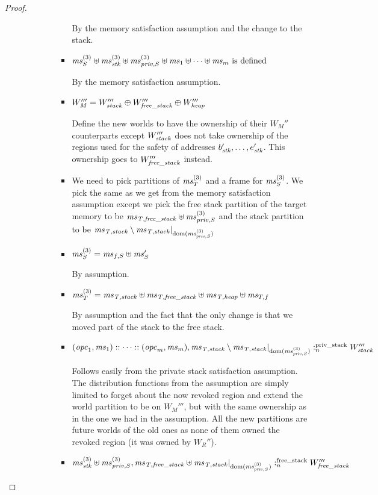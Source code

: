 \begin{proof}
\begin{description}
\begin{itemize}
\begin{itemize}
\begin{itemize}
          By the memory satisfaction assumption and the change to the stack.
        \item $\mathit{ms}^{(3)}_S \uplus \mathit{ms}^{(3)}_{\mathit{stk}} \uplus \mathit{ms}_{\mathit{priv},S}^{(3)} \uplus \mathit{ms}_1 \uplus \dots \uplus \mathit{ms}_m \text{ is defined}$

          By the memory satisfaction assumption.
        \item $W'''_M = W_{\mathit{stack}}''' \oplus W_{\mathit{free\_stack}}''' \oplus W_{\mathit{heap}}'''$

          Define the new worlds to have the ownership of their $W_M''$ counterparts except $W_{\mathit{stack}}'''$ does not take ownership of the regions used for the safety of addresses $b_{\mathit{stk}}',\dots,e_{\mathit{stk}}'$.
          This ownership goes to $W_{\mathit{free\_stack}}'''$ instead.
        \item We need to pick partitions of $\mathit{ms}^{(3)}_T$ and a frame for $\mathit{ms}^{(3)}_S$.
          We pick the same as we get from the memory satisfaction assumption except we pick the free stack partition of the target memory to be $\mathit{ms}_{\mathit{T,free\_stack}} \uplus \mathit{ms}_{\mathit{priv},S}^{(3)}$ and the stack partition to be $\mathit{ms}_{\mathit{T,stack}}\setminus \mathit{ms}_{\mathit{T,stack}} | _{\mathrm{dom}(\mathit{ms}_{\mathit{priv},S}^{(3)})}$
        \item $\mathit{ms}^{(3)}_S = \mathit{ms}_{f,S} \uplus \mathit{ms}_S'$

          By assumption.
        \item $\mathit{ms}^{(3)}_T = \mathit{ms}_{\mathit{T,stack}} \uplus \mathit{ms}_{\mathit{T,free\_stack}} \uplus \mathit{ms}_{\mathit{T,heap}} \uplus \mathit{ms}_{T,f}$

          By assumption and the fact that the only change is that we moved part of the stack to the free stack.
        \item $(\mathit{opc}_1,\mathit{ms}_1):: \dots :: (\mathit{opc}_m,\mathit{ms}_m),\mathit{ms}_{\mathit{T,stack}}\setminus \mathit{ms}_{\mathit{T,stack}} | _{\mathrm{dom}(\mathit{ms}_{\mathit{priv},S}^{(3)})} :_{n}^{\text{priv\_stack}}W_{\mathit{stack}}'''$

          Follows easily from the private stack satisfaction assumption.
          The distribution functions from the assumption are simply limited to forget about the now revoked region and extend the world partition to be on $W_M'''$, but with the same ownership as in the one we had in the assumption.
          All the new partitions are future worlds of the old ones as none of them owned the revoked region (it was owned by $W_R''$).
        \item $\mathit{ms}^{(3)}_{\mathit{stk}} \uplus \mathit{ms}_{\mathit{priv},S}^{(3)},\mathit{ms}_{\mathit{T,free\_stack}} \uplus \mathit{ms}_{\mathit{T,stack}} | _{\mathrm{dom}(\mathit{ms}_{\mathit{priv},S}^{(3)})} :_{n}^{\text{free\_stack}}W_{\mathit{free\_stack}}'''$


\end{itemize}
\end{itemize}
\end{itemize}
\end{description}
\end{proof}
